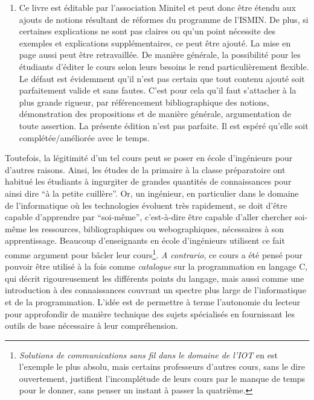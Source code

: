 \documentclass[../main.tex]{subfiles}
\begin{document}
\begin{enumerate}
	\item Ce livre est éditable par l'association Minitel et peut donc être étendu aux ajouts de notions résultant de réformes du programme de l'ISMIN. De plus, si certaines explications ne sont pas claires ou qu'un point nécessite des exemples et explications supplémentaires, ce peut être ajouté. La mise en page aussi peut être retravaillée. De manière générale, la possibilité pour les étudiants d'éditer le cours selon leurs besoins le rend particulièrement flexible. Le défaut est évidemment qu'il n'est pas certain que tout contenu ajouté soit parfaitement valide et sans fautes. C'est pour cela qu'il faut s'attacher à la plus grande rigueur, par référencement bibliographique des notions, démonstration des propositions et de manière générale, argumentation de toute assertion. La présente édition n'est pas parfaite. Il est espéré qu'elle soit complétée/améliorée avec le temps.
\end{enumerate}
Toutefois, la légitimité d'un tel cours peut se poser en école d'ingénieurs pour d'autres raisons. Ainsi, les études de la primaire à la classe préparatoire ont habitué les étudiants à ingurgiter de grandes quantités de connaissances pour ainsi dire ``à la petite cuillère''. Or, un ingénieur, en particulier dans le domaine de l'informatique où les technologies évoluent très rapidement, se doit d'être capable d'apprendre par ``soi-même'', c'est-à-dire être capable d'aller chercher soi-même les ressources, bibliographiques ou webographiques, nécessaires à son apprentissage. Beaucoup d'enseignants en école d'ingénieurs utilisent ce fait comme argument pour bâcler leur cours\footnote{\textit{Solutions de communications sans fil dans le domaine de l'IOT} en est l'exemple le plus absolu, mais certains professeurs d'autres cours, sans le dire ouvertement, justifient l'incomplétude de leurs cours par le manque de temps pour le donner, sans penser un instant à passer la quatrième.}. \textit{A contrario}, ce cours a été pensé pour pouvoir être utilisé à la fois comme \textit{catalogue} sur la programmation en langage C, qui décrit rigoureusement les différents points du langage, mais aussi comme une introduction à des connaissances couvrant un spectre plus large de l'informatique et de la programmation. L'idée est de permettre à terme l'autonomie du lecteur pour approfondir de manière technique des sujets spécialisés en fournissant les outils de base nécessaire à leur compréhension.
\end{document}
